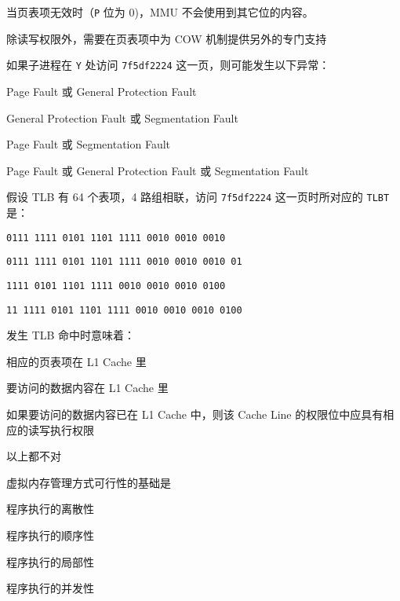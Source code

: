 \begin{problems}
\begin{choices}
                \item 当页表项无效时（\verb|P| 位为 0)，MMU 不会使用到其它位的内容。
                \item 除读写权限外，需要在页表项中为 COW 机制提供另外的专门支持
            \end{choices}
            \subqn 如果子进程在 \verb|Y| 处访问 \verb|7f5df2224| 这一页，则可能发生以下异常：
            \begin{choices}
                \item Page Fault 或 General Protection Fault
                \item General Protection Fault 或 Segmentation Fault
                \item Page Fault 或 Segmentation Fault
                \item Page Fault 或 General Protection Fault 或 Segmentation Fault
            \end{choices}
            \subqn 假设 TLB 有 64 个表项，4 路组相联，访问 \verb|7f5df2224| 这一页时所对应的 \verb|TLBT| 是：
            \begin{choices}
                \item \verb|0111 1111 0101 1101 1111 0010 0010 0010|
                \item \verb|0111 1111 0101 1101 1111 0010 0010 0010 01|
                \item \verb|1111 0101 1101 1111 0010 0010 0010 0100|
                \item \verb|11 1111 0101 1101 1111 0010 0010 0010 0100|
            \end{choices}
            \subqn 发生 TLB 命中时意味着：
            \begin{choices}
                \item 相应的页表项在 L1 Cache 里
                \item 要访问的数据内容在 L1 Cache 里
                \item 如果要访问的数据内容已在 L1 Cache 中，则该 Cache Line 的权限位中应具有相应的读写执行权限
                \item 以上都不对
            \end{choices}
         虚拟内存管理方式可行性的基础是
        \begin{choices}
            \item 程序执行的离散性
            \item 程序执行的顺序性
            \item 程序执行的局部性
            \item 程序执行的并发性

\end{choices}
\end{problems}

